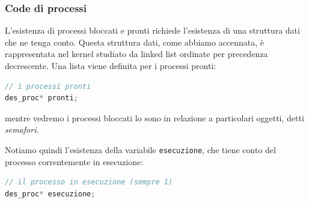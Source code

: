 \documentclass[a4paper,11pt]{article}
\begin{document}
\subsubsection{Code di processi}
L'esistenza di processi bloccati e pronti richiede l'esistenza di una struttura dati che ne tenga conto.
Questa struttura dati, come abbiamo accennata, è rappresentata nel kernel studiato da linked list ordinate per precedenza decrescente.
Una lista viene definita per i processi pronti:
\begin{lstlisting}[language=C++, style=codestyle]	
// i processi pronti
des_proc* pronti;
\end{lstlisting}
mentre vedremo i processi bloccati lo sono in relazione a particolari oggetti, detti \textit{semafori}.

Notiamo quindi l'esistenza della variabile \lstinline|esecuzione|, che tiene conto del processo correntemente in esecuzione:
\begin{lstlisting}[language=C++, style=codestyle]	
// il processo in esecuzione (sempre 1)
des_proc* esecuzione;
\end{lstlisting}
\end{document}
